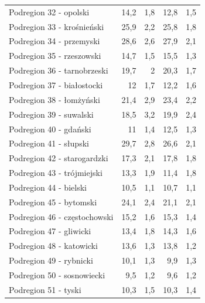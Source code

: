 \begin{center}
\begin{longtable}{p{6cm}rrrr}
Podregion 32 - opolski                   & 14,2    & 1,8         & 12,8     & 1,5          \\
Podregion 33 - krośnieński               & 25,9    & 2,2         & 25,8     & 1,8          \\
Podregion 34 - przemyski                 & 28,6    & 2,6         & 27,9     & 2,1          \\
Podregion 35 - rzeszowski                & 14,7    & 1,5         & 15,5     & 1,3          \\
Podregion 36 - tarnobrzeski              & 19,7    & 2           & 20,3     & 1,7          \\
Podregion 37 - białostocki               & 12      & 1,7         & 12,2     & 1,6          \\
Podregion 38 - łomżyński                 & 21,4    & 2,9         & 23,4     & 2,2          \\
Podregion 39 - suwalski                  & 18,5    & 3,2         & 19,9     & 2,4          \\
Podregion 40 - gdański                   & 11      & 1,4         & 12,5     & 1,3          \\
Podregion 41 - słupski                   & 29,7    & 2,8         & 26,6     & 2,1          \\
Podregion 42 - starogardzki              & 17,3    & 2,1         & 17,8     & 1,8          \\
Podregion 43 - trójmiejski               & 13,3    & 1,9         & 11,4     & 1,8          \\
Podregion 44 - bielski                   & 10,5    & 1,1         & 10,7     & 1,1          \\
Podregion 45 - bytomski                  & 24,1    & 2,4         & 21,1     & 2,1          \\
Podregion 46 - częstochowski             & 15,2    & 1,6         & 15,3     & 1,4          \\
Podregion 47 - gliwicki                  & 13,4    & 1,8         & 14,3     & 1,6          \\
Podregion 48 - katowicki                 & 13,6    & 1,3         & 13,8     & 1,2          \\
Podregion 49 - rybnicki                  & 10,1    & 1,3         & 9,9      & 1,3          \\
Podregion 50 - sosnowiecki               & 9,5     & 1,2         & 9,6      & 1,2          \\
Podregion 51 - tyski                     & 10,3    & 1,5         & 10,3     & 1,4          \\

\end{longtable}
\end{center}
